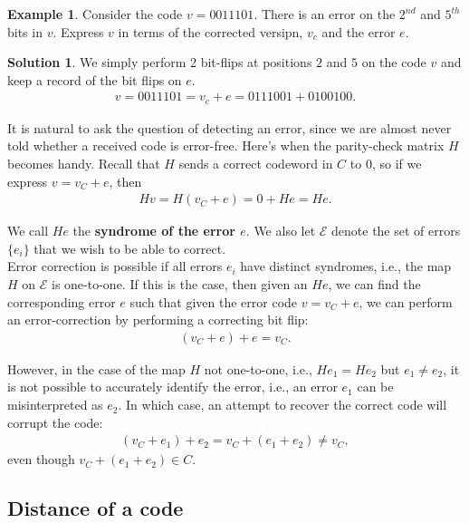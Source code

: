 \documentclass{article}
\theoremstyle{definition}
\newtheorem{exmp}{Example}[section]
\newtheorem{sln}{Solution}[section]
\begin{document}
\begin{exmp}
	Consider the code $v = 0011101$. There is an error on the $2^{nd}$ and $5^{th}$ bits in $v$. Express $v$ in terms of the corrected versipn, $v_c$ and the error $e$.\\
	
	\begin{sln}
		We simply perform 2 bit-flips at positions $2$ and $5$ on the code $v$ and keep a record of the bit flips on $e$.
		\begin{align}
		v = 0011101 = v_c + e = 0111001 + 0100100.
		\end{align}
	\end{sln}
\end{exmp}


It is natural to ask the question of detecting an error, since we are almost never told whether a received code is error-free. Here's when the parity-check matrix $H$ becomes handy. Recall that $H$ sends a correct codeword in $C$ to 0, so if we express $v = v_C + e$, then
\begin{align}
Hv = H(v_C + e) = 0 + He = He.
\end{align} 

We call $He$ the \textbf{syndrome of the error $e$}. We also let $\mathcal{E}$ denote the set of errors $\{e_i\}$ that we wish to be able to correct. \\

Error correction is possible if all errors $e_i$ have distinct syndromes, i.e., the map $H$ on $\mathcal{E}$ is one-to-one. If this is the case, then given an $He$, we can find the corresponding error $e$ such that given the error code $v = v_C + e$, we can perform an error-correction by performing a correcting bit flip:
\begin{align}
(v_C + e) + e = v_C.
\end{align}

However, in the case of the map $H$ not one-to-one, i.e., $He_1 = He_2$ but $e_1 \neq e_2$, it is not possible to accurately identify the error, i.e., an error $e_1$ can be misinterpreted as $e_2$. In which case, an attempt to recover the correct code will corrupt the code:
\begin{align}
(v_C + e_1) + e_2 = v_C + (e_1 + e_2) \neq v_C,
\end{align} 
even though $v_C + (e_1 + e_2) \in C$. 

\subsection{Distance of a code}
\end{document}
